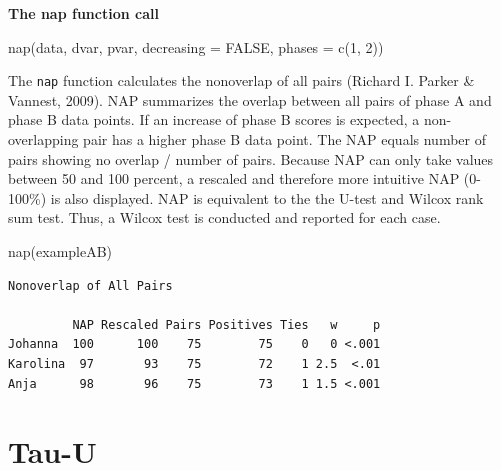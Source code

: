 \documentclass[
  letterpaper,
  DIV=11,
  numbers=noendperiod]{scrreprt}
\newenvironment{Shaded}{\begin{snugshade}}{\end{snugshade}}
\newcommand{\FunctionTok}[1]{\textcolor[rgb]{0.28,0.35,0.67}{#1}}
\newcommand{\NormalTok}[1]{\textcolor[rgb]{0.00,0.23,0.31}{#1}}
\begin{document}
\begin{tcolorbox}[enhanced jigsaw, breakable, rightrule=.15mm, bottomrule=.15mm, arc=.35mm, colback=white, colframe=quarto-callout-tip-color-frame, opacityback=0, leftrule=.75mm, toprule=.15mm, left=2mm]
\begin{minipage}[t]{5.5mm}
\textcolor{quarto-callout-tip-color}{\faLightbulb}
\end{minipage}%
\begin{minipage}[t]{\textwidth - 5.5mm}

\textbf{The nap function call}\vspace{2mm}

nap(data, dvar, pvar, decreasing = FALSE, phases = c(1, 2))

\end{minipage}%
\end{tcolorbox}

The \texttt{nap} function calculates the nonoverlap of all pairs
(Richard I. Parker \& Vannest, 2009). NAP summarizes the overlap between
all pairs of phase A and phase B data points. If an increase of phase B
scores is expected, a non-overlapping pair has a higher phase B data
point. The NAP equals number of pairs showing no overlap / number of
pairs. Because NAP can only take values between 50 and 100 percent, a
rescaled and therefore more intuitive NAP (0-100\%) is also displayed.
NAP is equivalent to the the U-test and Wilcox rank sum test. Thus, a
Wilcox test is conducted and reported for each case.

\begin{Shaded}
\begin{Highlighting}[]
\FunctionTok{nap}\NormalTok{(exampleAB)}
\end{Highlighting}
\end{Shaded}

\begin{verbatim}
Nonoverlap of All Pairs

         NAP Rescaled Pairs Positives Ties   w     p
Johanna  100      100    75        75    0   0 <.001
Karolina  97       93    75        72    1 2.5  <.01
Anja      98       96    75        73    1 1.5 <.001
\end{verbatim}

\hypertarget{tau-u}{%
\section{Tau-U}\label{tau-u}}
\end{document}
